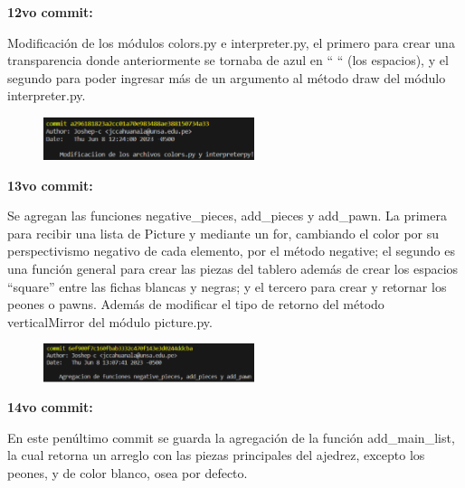 \documentclass{article}
\begin{document}
	\textbf{12vo commit:}
	
	\vspace{0.3cm}
	Modificación de los módulos colors.py e interpreter.py, el primero para crear una transparencia donde anteriormente se tornaba de azul en “ “ (los espacios), y el segundo para poder ingresar más de un argumento al método draw del módulo interpreter.py.
	\vspace{0.3cm}
	
	\begin{figure}[H]
		\centering
		\includegraphics[width=0.55\textwidth,keepaspectratio]{img/commit12.png}
	\end{figure}
	
	\textbf{13vo commit:}
	
	\vspace{0.3cm}
	Se agregan las funciones negative\_pieces, add\_pieces y add\_pawn. La primera para recibir una lista de Picture y mediante un for, cambiando el color por su perspectivismo negativo de cada elemento, por el método negative; el segundo es una función general para crear las piezas del tablero además de crear los espacios “square” entre las fichas blancas y negras; y el tercero para crear y retornar los peones o pawns. Además de modificar el tipo de retorno del método verticalMirror del módulo picture.py.
	\vspace{0.3cm}
	
	\begin{figure}[H]
		\centering
		\includegraphics[width=0.55\textwidth,keepaspectratio]{img/commit13.png}
	\end{figure}
	
	\textbf{14vo commit:}
	
	\vspace{0.3cm}
	En este penúltimo commit se guarda la agregación de la función add\_main\_list, la cual retorna un arreglo con las piezas principales del ajedrez, excepto los peones, y de color blanco, osea por defecto.
	\vspace{0.3cm}
	
\end{document}
